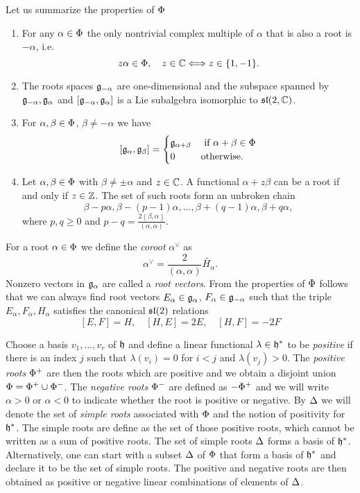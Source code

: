 Let us summarize the properties of $\Phi$
\begin{enumerate}
 \item For any $\alpha \in \Phi$ the only nontrivial complex multiple of $\alpha$ that is also a root is $-\alpha$, i.e.
	\[ z \alpha \in \Phi, \quad z\in \mathbb{C} \Longleftrightarrow z \in \{ 1, -1 \}. \]
 \item The roots spaces $\mathfrak{g}_{-\alpha}$ are one-dimensional and the subspace spanned by $\mathfrak{g}_{-\alpha}, \mathfrak{g}_\alpha$ and $[\mathfrak{g}_{-\alpha}, \mathfrak{g}_\alpha]$ is a Lie subalgebra isomorphic to $\mathfrak{sl}(2,\mathbb{C})$.
 \item For $\alpha, \beta \in \Phi$, $\beta \neq -\alpha$ we have
 \[
  [\mathfrak{g}_\alpha,\mathfrak{g}_\beta] = \begin{cases}
				      \mathfrak{g}_{\alpha + \beta} & \text{ if } \alpha + \beta \in \Phi \\
				        0 & \text{otherwise}.
                                  \end{cases}
 \]
 \item Let $\alpha, \beta \in \Phi$ with $\beta \neq \pm \alpha$ and $z\in\mathbb{C}$. A functional $\alpha + z\beta$ can be a root if and only if $z\in\mathbb{Z}$. The set of such roots form an unbroken chain
 \[ \beta - p\alpha, \beta -(p-1)\alpha, \ldots, \beta + (q-1)\alpha, \beta +q\alpha, \]
       where $p,q\geq 0$ and $p-q = \frac{2(\beta,\alpha)}{(\alpha,\alpha)}$. 
\end{enumerate}

For a root $\alpha \in \Phi$ we define the \emph{coroot} $\alpha^\vee$ as
\[
\alpha^\vee = \frac{2}{(\alpha,\alpha)}\widetilde{H_\alpha}.
\]
Nonzero vectors in $\mathfrak{g}_\alpha$ are called a \emph{root vectors}. From the properties of $\Phi$ follows that we can always find root vectors $E_\alpha \in \mathfrak{g}_\alpha$, $F_\alpha \in \mathfrak{g}_{-\alpha}$ such that the triple $E_\alpha, F_\alpha, H_\alpha$ satisfies the canonical $\mathfrak{sl}(2)$ relations
\[
 [E,F] = H, \quad [H,E] = 2E, \quad [H,F] = -2F
\]

Choose a basis $v_1, \ldots, v_r$ of $\mathfrak{h}$ and define a linear functional $\lambda\in\mathfrak{h}^*$ to be \emph{positive} if there is an index $j$ such that $\lambda(v_i) = 0$ for $i<j$ and $\lambda(v_j) > 0$. The \emph{positive roots} $\Phi^+$ are then the roots which are positive and we obtain a disjoint union $\Phi = \Phi^+ \cup \Phi^-$. The \emph{negative roots}  $\Phi^-$ are defined as $-\Phi^+$ and we will write $\alpha > 0$ or $\alpha < 0$ to indicate whether the root is positive or negative. By $\Delta$ we will denote the set of \emph{simple roots} associated with $\Phi$ and the notion of positivity for $\mathfrak{h}^*$. The simple roots are define as the set of those positive roots, which cannot be written as a sum of positive roots. The set of simple roots $\Delta$ forms a basis of $\mathfrak{h}^*$. Alternatively, one can start with a subset $\Delta$ of $\Phi$ that form a basis of $\mathfrak{h}^*$ and declare it to be the set of simple roots. The positive and negative roots are then obtained as 
positive or negative linear combinations of elements of $\Delta$.

